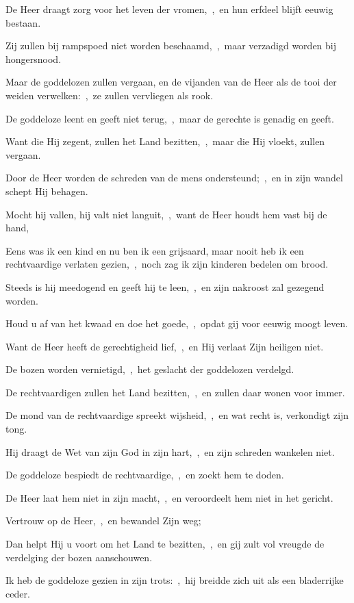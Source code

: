 \documentclass[12pt,twoside,a5paper]{article}
\begin{document}
\begin{halfparskip}
  De Heer draagt zorg voor het leven der vromen,~\sep\ en hun erfdeel blijft eeuwig bestaan.

  Zij zullen bij rampspoed niet worden beschaamd,~\sep\ maar verzadigd worden bij hongersnood.

  Maar de goddelozen zullen vergaan, en de vijanden van de Heer als de tooi der weiden verwelken:~\sep\ ze zullen vervliegen als rook.

  De goddeloze leent en geeft niet terug,~\sep\ maar de gerechte is genadig en geeft.

  Want die Hij zegent, zullen het Land bezitten,~\sep\ maar die Hij vloekt, zullen vergaan.

  Door de Heer worden de schreden van de mens ondersteund;~\sep\ en in zijn wandel schept Hij behagen.

  Mocht hij vallen, hij valt niet languit,~\sep\ want de Heer houdt hem vast bij de hand,

  Eens was ik een kind en nu ben ik een grijsaard, maar nooit heb ik een rechtvaardige verlaten gezien,~\sep\ noch zag ik zijn kinderen bedelen om brood.

  Steeds is hij meedogend en geeft hij te leen,~\sep\ en zijn nakroost zal gezegend worden.

  Houd u af van het kwaad en doe het goede,~\sep\ opdat gij voor eeuwig moogt leven.

  Want de Heer heeft de gerechtigheid lief,~\sep\ en Hij verlaat Zijn heiligen niet.

  De bozen worden vernietigd,~\sep\ het geslacht der goddelozen verdelgd.

  De rechtvaardigen zullen het Land bezitten,~\sep\ en zullen daar wonen voor immer.

  De mond van de rechtvaardige spreekt wijsheid,~\sep\ en wat recht is, verkondigt zijn tong.

  Hij draagt de Wet van zijn God in zijn hart,~\sep\ en zijn schreden wankelen niet.

  De goddeloze bespiedt de rechtvaardige,~\sep\ en zoekt hem te doden.

  De Heer laat hem niet in zijn macht,~\sep\ en veroordeelt hem niet in het gericht.

  Vertrouw op de Heer,~\sep\ en bewandel Zijn weg;

  Dan helpt Hij u voort om het Land te bezitten,~\sep\ en gij zult vol vreugde de verdelging der bozen aanschouwen.

  Ik heb de goddeloze gezien in zijn trots:~\sep\ hij breidde zich uit als een bladerrijke ceder.


\end{halfparskip}
\end{document}
